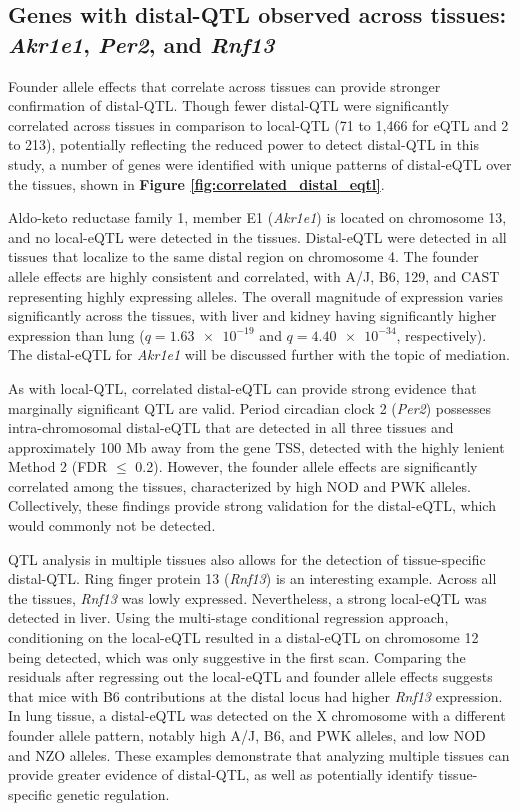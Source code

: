 \subsection{Genes with distal-QTL observed across tissues: \textit{Akr1e1}, \textit{Per2}, and \textit{Rnf13}}

Founder allele effects that correlate across tissues can provide stronger confirmation of distal-QTL. Though fewer distal-QTL were significantly correlated across tissues in comparison to local-QTL (71 to 1,466 for eQTL and 2 to 213), potentially reflecting the reduced power to detect distal-QTL in this study, a number of genes were identified with unique patterns of distal-eQTL over the tissues, shown in \textbf{Figure \ref{fig:correlated_distal_eqtl}}.

Aldo-keto reductase family 1, member E1 (\textit{Akr1e1}) is located on chromosome 13, and no local-eQTL were detected in the tissues. Distal-eQTL were detected in all tissues that localize to the same distal region on chromosome 4. The founder allele effects are highly consistent and correlated, with A/J, B6, 129, and CAST representing highly expressing alleles. The overall magnitude of expression varies significantly across the tissues, with liver and kidney having significantly higher expression than lung ($q = \num{1.63e-19}$ and $q = \num{4.40e-34}$, respectively). The distal-eQTL for \textit{Akr1e1} will be discussed further with the topic of mediation.

As with local-QTL, correlated distal-eQTL can provide strong evidence that marginally significant QTL are valid. Period circadian clock 2 (\textit{Per2}) possesses intra-chromosomal distal-eQTL that are detected in all three tissues and approximately 100 Mb away from the gene TSS, detected with the highly lenient Method 2 (FDR $\leq$ 0.2). However, the founder allele effects are significantly correlated among the tissues, characterized by high NOD and PWK alleles. Collectively, these findings provide strong validation for the distal-eQTL, which would commonly not be detected.

QTL analysis in multiple tissues also allows for the detection of tissue-specific distal-QTL. Ring finger protein 13 (\textit{Rnf13}) is an interesting example. Across all the tissues, \textit{Rnf13} was lowly expressed. Nevertheless, a strong local-eQTL was detected in liver. Using the multi-stage conditional regression approach, conditioning on the local-eQTL resulted in a distal-eQTL on chromosome 12 being detected, which was only suggestive in the first scan. Comparing the residuals after regressing out the local-eQTL and founder allele effects suggests that mice with B6 contributions at the distal locus had higher \textit{Rnf13} expression. In lung tissue, a distal-eQTL was detected on the X chromosome with a different founder allele pattern, notably high A/J, B6, and PWK alleles, and low NOD and NZO alleles. These examples demonstrate that analyzing multiple tissues can provide greater evidence of distal-QTL, as well as potentially identify tissue-specific genetic regulation.

